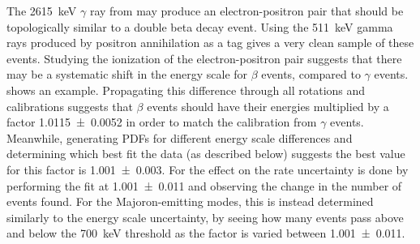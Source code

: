 \documentclass[herrin-thesis.tex]{subfiles}
\begin{document}
The \SI{2615}{\keV} \(\gamma\) ray from  may produce an electron-positron pair that should be topologically similar to a double beta decay event. Using the \SI{511}{\keV} gamma rays produced by positron annihilation as a tag gives a very clean sample of these events. Studying the ionization of the electron-positron pair suggests that there may be a systematic shift in the energy scale for \(\beta\) events, compared to \(\gamma\) events.  shows an example. Propagating this difference through all rotations and calibrations suggests that \(\beta\) events should have their energies multiplied by a factor \num{1.0115\pm0.0052} in order to match the calibration from \(\gamma\) events. Meanwhile, generating PDFs for different energy scale differences and determining which best fit the data (as described below) suggests the best value for this factor is \num{1.001\pm0.003}. For \twonu{} the effect on the rate uncertainty is done by performing the fit at \num{1.001\pm0.011} and observing the change in the number of events found. For the Majoron-emitting modes, this is instead determined similarly to the energy scale uncertainty, by seeing how many events pass above and below the \SI{700}{\keV} threshold as the factor is varied between \num{1.001\pm0.011}.
\end{document}
